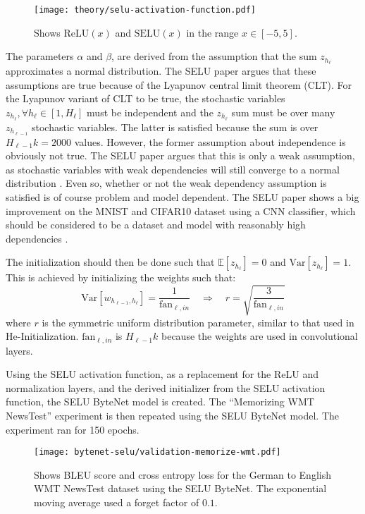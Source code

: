 \begin{figure}[h]
    \centering
    \texttt{[image: theory/selu-activation-function.pdf]}
    \caption{Shows $\mathrm{ReLU}(x)$ and $\mathrm{SELU}(x)$ in the range $x \in [-5, 5]$.}
    \label{fig:result:selu-bytenet:bytenet-selu-activation}
\end{figure}

The parameters $\alpha$ and $\beta$, are derived from the assumption that the sum $z_{h_\ell}$ approximates a normal distribution. The SELU paper argues that these assumptions are true because of the Lyapunov central limit theorem (CLT). For the Lyapunov variant of CLT to be true, the stochastic variables $z_{h_\ell}, \forall h_\ell \in [1, H_\ell]$ must be independent and the $z_{h_\ell}$ sum must be over many $z_{h_{\ell-1}}$ stochastic variables. The latter is satisfied because the sum is over $H_{\ell-1} k = 2000$ values. However, the former assumption about independence is obviously not true. The SELU paper argues that this is only a weak assumption, as stochastic variables with weak dependencies will still converge to a normal distribution \cite{selu, weak-clt}. Even so, whether or not the weak dependency assumption is satisfied is of course problem and model dependent. The SELU paper shows a big improvement on the MNIST and CIFAR10 dataset using a CNN classifier, which should be considered to be a dataset and model with reasonably high dependencies \cite{selu}.

The initialization should then be done such that $\mathbb{E}[z_{h_\ell}] = 0$ and $\mathrm{Var}[z_{h_\ell}] = 1$. This is achieved by initializing the weights such that:
\begin{equation}
\mathrm{Var}[w_{h_{\ell-1}, h_{\ell}}] = \frac{1}{\mathrm{fan}_{\ell, in}} \quad \Rightarrow \quad r = \sqrt{\frac{3}{\mathrm{fan}_{\ell, in}}}
\end{equation}
where $r$ is the symmetric uniform distribution parameter, similar to that used in He-Initialization. $\mathrm{fan}_{\ell, in}$ is $H_{\ell-1} k$ because the weights are used in convolutional layers.

Using the SELU activation function, as a replacement for the ReLU and normalization layers, and the derived initializer from the SELU activation function, the SELU ByteNet model is created. The ``Memorizing WMT NewsTest'' experiment is then repeated using the SELU ByteNet model. The experiment ran for 150 epochs.

\begin{figure}[H]
    \centering
    \texttt{[image: bytenet-selu/validation-memorize-wmt.pdf]}
    \caption{Shows BLEU score and cross entropy loss for the German to English WMT NewsTest dataset using the SELU ByteNet. The exponential moving average used a forget factor of $0.1$.}
    \label{fig:result:selu-bytenet:bytenet-selu-wmt}
\end{figure}

